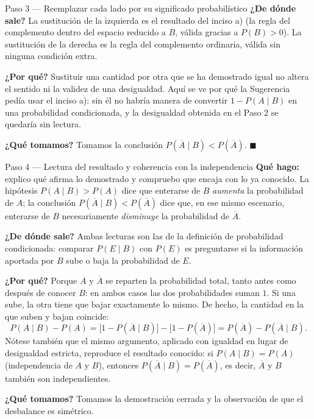 \documentclass[11pt]{article}
\begin{document}
\begin{sol}
\begin{paso}{Paso 3 --- Reemplazar cada lado por su significado probabilístico}
\textbf{¿De dónde sale?} La sustitución de la izquierda es el resultado del inciso a) (la
regla del complemento dentro del espacio reducido a $B$, válida gracias a $P(B)>0$). La
sustitución de la derecha es la regla del complemento ordinaria, válida sin ninguna
condición extra.

\textbf{¿Por qué?} Sustituir una cantidad por otra que se ha demostrado igual no altera el
sentido ni la validez de una desigualdad. Aquí se ve por qué la Sugerencia pedía usar el
inciso a): sin él no habría manera de convertir $1-P(A\mid B)$ en una probabilidad
condicionada, y la desigualdad obtenida en el Paso 2 se quedaría sin lectura.

\textbf{¿Qué tomamos?} Tomamos la conclusión $P(\overline{A}\mid B)<P(\overline{A})$.
$\blacksquare$
\end{paso}

\begin{paso}{Paso 4 --- Lectura del resultado y coherencia con la independencia}
\textbf{Qué hago:} explico qué afirma lo demostrado y compruebo que encaja con lo ya conocido.
La hipótesis $P(A\mid B)>P(A)$ dice que enterarse de $B$ \emph{aumenta} la probabilidad de
$A$; la conclusión $P(\overline{A}\mid B)<P(\overline{A})$ dice que, en ese mismo escenario,
enterarse de $B$ necesariamente \emph{disminuye} la probabilidad de $\overline{A}$.

\textbf{¿De dónde sale?} Ambas lecturas son las de la definición de probabilidad
condicionada: comparar $P(E\mid B)$ con $P(E)$ es preguntarse si la información aportada por
$B$ sube o baja la probabilidad de $E$.

\textbf{¿Por qué?} Porque $A$ y $\overline{A}$ se reparten la probabilidad total, tanto antes
como después de conocer $B$: en ambos casos las dos probabilidades suman $1$. Si una sube, la
otra tiene que bajar exactamente lo mismo. De hecho, la cantidad en la que suben y bajan
coincide:
\[
P(A\mid B)-P(A)=\bigl[1-P(\overline{A}\mid B)\bigr]-\bigl[1-P(\overline{A})\bigr]
=P(\overline{A})-P(\overline{A}\mid B).
\]
Nótese también que el mismo argumento, aplicado con igualdad en lugar de desigualdad estricta,
reproduce el resultado conocido: si $P(A\mid B)=P(A)$ (independencia de $A$ y $B$), entonces
$P(\overline{A}\mid B)=P(\overline{A})$, es decir, $\overline{A}$ y $B$ también son
independientes.

\textbf{¿Qué tomamos?} Tomamos la demostración cerrada y la observación de que el desbalance
es simétrico.
\end{paso}
\end{sol}
\end{document}
